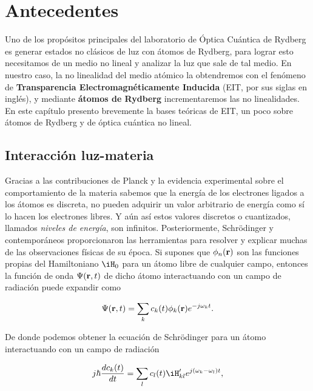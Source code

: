 \chapter{\label{cap:antecedentes}Antecedentes}

Uno de los propósitos principales del laboratorio de Óptica Cuántica de Rydberg es generar estados no clásicos de luz con átomos de Rydberg, para lograr esto necesitamos de un medio no lineal y analizar la luz que sale de tal medio. En nuestro caso, la no linealidad del medio atómico la obtendremos con el fenómeno de \textbf{Transparencia Electromagnéticamente Inducida} (EIT, por sus siglas en inglés), y mediante \textbf{átomos de Rydberg} incrementaremos las no linealidades. En este capítulo presento brevemente la bases teóricas de EIT, un poco sobre átomos de Rydberg y de óptica cuántica no lineal.

\section{\label{sec:interaccionLuzMateria}Interacción luz-materia}

Gracias a las contribuciones de Planck y la evidencia experimental sobre el comportamiento de la materia sabemos que la energía de los electrones ligados a los átomos es discreta, no pueden adquirir un valor arbitrario de energía como sí lo hacen los electrones libres. Y aún así estos valores discretos o cuantizados, llamados \emph{niveles de energía}, son infinitos. Posteriormente, Schrödinger y contemporáneos proporcionaron las herramientas para resolver y explicar muchas de las observaciones físicas de su época. Si supones que $\phi_{n}(\text{\textbf{r}})$ son las funciones propias del Hamiltoniano $\iH_\sm{0}$ para un átomo libre de cualquier campo, entonces la función de onda $\Psi(\text{\textbf{r}},t)$ de dicho átomo interactuando con un campo de radiación puede expandir como

\begin{equation}
\label{ec:funcionOndaExpansion}
\Psi(\text{\textbf{r}},t)=\sum_{k}c_{k}(t)\phi_{k}(\text{\textbf{r}})e^{-j\omega_{k}t}.
\end{equation}

De donde podemos obtener la ecuación de Schrödinger para un átomo interactuando con un campo de radiación~\cite{metcalf}

\begin{equation}
\label{ec:ecuacionSchrodinger}
j\hbar\dfrac{dc_\sm{k}(t)}{dt}= \sum_{l}c_\sm{l}(t)\iH'_\sm{kl}e^{j(\omega_{k}-\omega_{l})t},
\end{equation}

